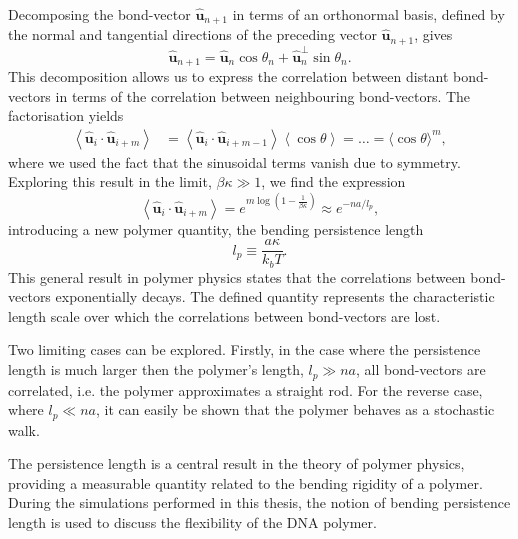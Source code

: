 Decomposing the bond-vector $\boldsymbol{\hat{u}}_{n+1}$ in terms of an orthonormal
basis, defined by the normal and tangential directions of the preceding vector
$\boldsymbol{\hat{u}}_{n+1}$, gives
\begin{equation}
\boldsymbol{\hat{u}}_{n+1} = \boldsymbol{\hat{u}}_{n} \cos \theta_{n} +
\boldsymbol{\hat{u}}_{n}^{\perp} \sin \theta_{n}.
\end{equation}
This decomposition allows us to express the correlation between distant bond-vectors in
terms of the correlation between neighbouring bond-vectors. The factorisation
yields
\begin{equation}
\begin{aligned}
    \left\langle\boldsymbol{\hat{u}}_{i} \cdot \boldsymbol{\hat{u}}_{i+m}\right\rangle
    &=\left\langle\boldsymbol{\hat{u}}_{i} \cdot
        \boldsymbol{\hat{u}}_{i+m-1}\right\rangle\left\langle\cos
    \theta\right\rangle = \dots =\langle\cos \theta\rangle^{m},
\end{aligned}
\end{equation}
where we used the fact that the sinusoidal terms vanish due to symmetry.
Exploring this result in the limit, $\beta \kappa \gg 1$, we find the expression
\begin{equation}
    \left\langle\boldsymbol{\hat{u}}_{i} \cdot \boldsymbol{\hat{u}}_{i+m}\right\rangle =
    e^{m \log(1 - \frac{1}{\beta \kappa})} \approx e^{-na/l_p},
\end{equation}
introducing a new polymer quantity, the bending persistence length
\begin{equation}
    l_p \equiv \frac{a \kappa}{k_{b} T}.
    \label{eq:persistance}
\end{equation}
This general result in polymer physics states that the correlations between bond-vectors
exponentially decays. The defined quantity represents the characteristic
length scale over which the correlations between bond-vectors are lost.

Two limiting cases can be explored. Firstly, in the
case where the persistence length is much larger then the polymer's length, $l_p \gg na$,
all bond-vectors are correlated, i.e. the polymer approximates a straight rod. For the
reverse case, where $l_p \ll na$, it can easily be shown that the polymer behaves as a
stochastic walk.

The persistence length is a central result in the theory of polymer physics, providing a
measurable quantity related to the bending rigidity of a polymer. During the
simulations performed in this thesis, the notion of bending persistence length is used to
discuss the flexibility of the DNA polymer.

